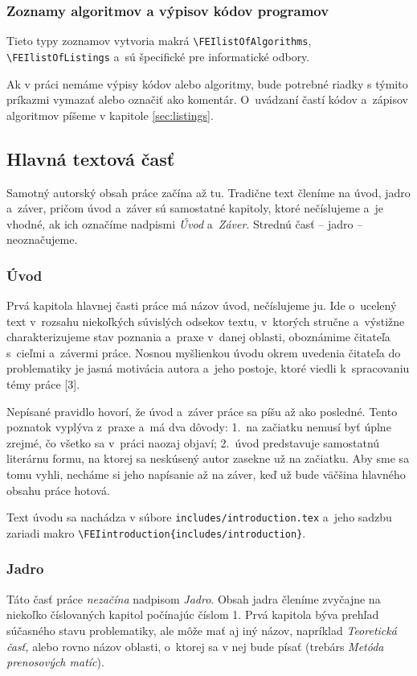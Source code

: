 \subsubsection*{\normalsize Zoznamy algoritmov a výpisov kódov programov}
Tieto typy zoznamov vytvoria makrá \verb|\FEIlistOfAlgorithms|, \verb|\FEIlistOfListings| a~sú špecifické pre informatické odbory.

Ak v práci nemáme výpisy kódov alebo algoritmy,
bude potrebné riadky s týmito príkazmi vymazať alebo označiť ako komentár. O~uvádzaní častí kódov
a~zápisov algoritmov píšeme v kapitole \ref{sec:listings}.

\subsection{Hlavná textová časť}
Samotný autorský obsah práce začína až tu.
Tradične text členíme na úvod, jadro a~záver,
pričom úvod a~záver sú samostatné kapitoly,
ktoré nečíslujeme a~je vhodné,
ak ich označíme nadpismi \emph{Úvod} a~\emph{Záver}.
Strednú časť -- jadro -- neoznačujeme.

\subsubsection{Úvod}
Prvá kapitola hlavnej časti práce má názov úvod, nečíslujeme ju.
Ide o~ucelený text v~rozsahu niekoľkých súvislých odsekov textu,
v~ktorých stručne a~výstižne charakterizujeme stav poznania
a~praxe v~danej oblasti,
oboznámime čitateľa s~cieľmi a~závermi práce.
Nosnou myšlienkou úvodu okrem uvedenia čitateľa do problematiky
je jasná motivácia autora a~jeho postoje,
ktoré viedli k~spracovaniu témy práce [3].

Nepísané pravidlo hovorí,
že úvod a~záver práce sa píšu až ako posledné.
Tento poznatok vyplýva z~praxe a~má dva dôvody:
1.~na začiatku nemusí byť úplne zrejmé, čo všetko sa v~práci naozaj objaví;
2.~úvod predstavuje samostatnú literárnu formu,
na ktorej sa neskúsený autor zasekne už na začiatku.
Aby sme sa tomu vyhli,
necháme si jeho napísanie až na záver,
keď už bude väčšina hlavného obsahu práce hotová.

Text úvodu sa nachádza v súbore \verb|includes/introduction.tex|
a~jeho sadzbu zariadi makro \verb|\FEIintroduction{includes/introduction}|.

\subsubsection{Jadro}
Táto časť práce \emph{nezačína} nadpisom \emph{Jadro}.
Obsah jadra členíme zvyčajne na niekoľko číslovaných
kapitol počínajúc číslom 1.
Prvá kapitola býva prehľad súčasného stavu problematiky,
ale môže mať aj iný názov,
napríklad \emph{Teoretická časť,} alebo rovno názov oblasti,
o~ktorej sa v nej bude písať
(trebárs \emph{Metóda prenosových matíc}).

